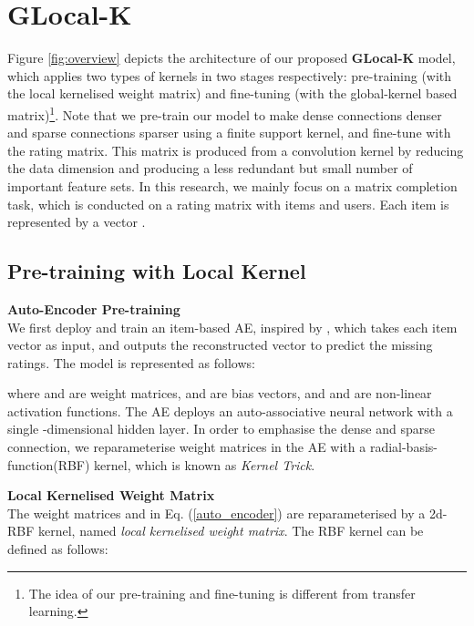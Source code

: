 \documentclass[sigconf]{acmart}
\begin{document}
\section{GLocal-K}
Figure \ref{fig:overview} depicts the architecture of our proposed \textbf{GLocal-K} model, which applies two types of kernels in two stages respectively: pre-training (with the local kernelised weight matrix) and fine-tuning (with the global-kernel based matrix)\footnote{The idea of our pre-training and fine-tuning is different from transfer learning.}. Note that we pre-train our model to make dense connections denser and sparse connections sparser using a finite support kernel, and fine-tune with the rating matrix. This matrix is produced from a convolution kernel by reducing the data dimension and producing a less redundant but small number of important feature sets. In this research, we mainly focus on a matrix completion task, which is conducted on a rating matrix  with  items and  users. Each item  is represented by a vector . 
\setlength{\belowdisplayskip}{5pt}
\setlength{\abovedisplayskip}{5pt}

\subsection{Pre-training with Local Kernel}
\textbf{Auto-Encoder Pre-training}\\
We first deploy and train an item-based AE, inspired by \cite{sedhain2015autorec}, which takes each item vector  as input, and outputs the reconstructed vector  to predict the missing ratings. The model is represented as follows:
\setlength{\belowdisplayskip}{4pt}
\setlength{\abovedisplayskip}{4pt}

where  and  are weight matrices,  and  are bias vectors, and  and  are non-linear activation functions. The AE deploys an auto-associative neural network with a single -dimensional hidden layer. In order to emphasise the dense and sparse connection, we reparameterise weight matrices in the AE with a radial-basis-function(RBF) kernel, which is known as \textit{Kernel Trick}\cite{giannakopoulos2008novel}.

\medskip

\noindent\textbf{Local Kernelised Weight Matrix}\\
The weight matrices  and  in Eq. (\ref{auto_encoder}) are reparameterised by a 2d-RBF kernel, named \textit{local kernelised weight matrix}. The RBF kernel can be defined as follows:
\setlength{\belowdisplayskip}{4pt}
\setlength{\abovedisplayskip}{4pt}
\end{document}
